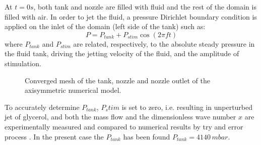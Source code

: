 \documentclass[twocolumn,10pt]{asme2ej}
\begin{document}
At $t=0s$, both tank and nozzle are filled with fluid and the rest of the domain is filled with air. In order to jet the fluid, a pressure Dirichlet boundary condition is applied on the inlet of the domain (left side of the tank) such as:
\begin{equation} \label{eq:plim}
    P=P_{tank}+P_{stim}\cos(2\pi f t)
\end{equation}
where $P_{tank}$ and $P_{stim}$ are related, respectively, to the absolute steady pressure in the fluid tank, driving the jetting velocity of the fluid, and the amplitude of stimulation.
\begin{figure}[H]
    \centering    
    \caption{Converged mesh of the tank, nozzle and nozzle outlet of the axisymmetric numerical model.} 
    \label{fig:meshGlycerol}
\end{figure}

To accurately determine $P_{tank}$, $P_stim$ is set to zero, i.e. resulting in unperturbed jet of glycerol, and both the mass flow and the dimensionless wave number $x$ are experimentally measured and compared to numerical results by try and error process . In the present case the $P_{tank}$ has been found $P_{tank}=4140 \, mbar$. 
\end{document}
